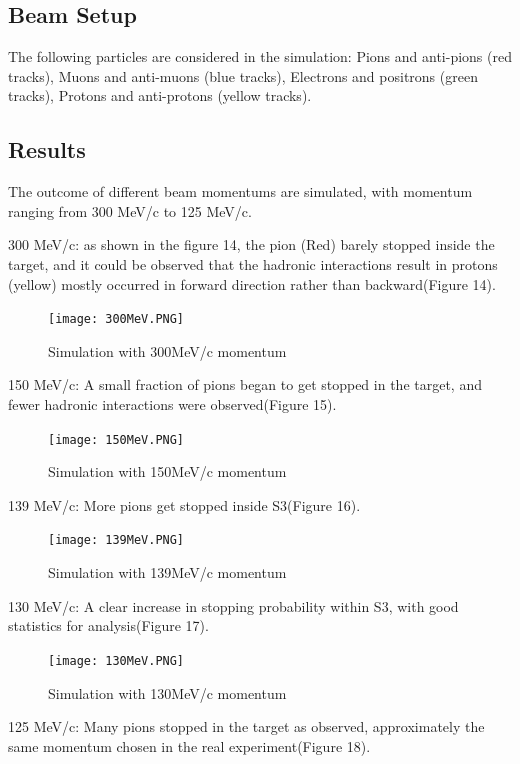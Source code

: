 \documentclass[11pt,a4paper]{article}
\begin{document}
\subsection{Beam Setup}
The following particles are considered in the simulation: Pions and anti-pions (red tracks), Muons and anti-muons (blue tracks), Electrons and positrons (green tracks), Protons and anti-protons (yellow tracks). 

\subsection{Results}
The outcome of different beam momentums are simulated, with momentum ranging from 300 MeV/c to 125 MeV/c. 

300 MeV/c: as shown in the figure 14, the pion (Red) barely stopped inside the target, and it could be observed that the hadronic interactions result in protons (yellow) mostly occurred in forward direction rather than backward(Figure 14).

\begin{figure}[h]
\centering
\texttt{[image: 300MeV.PNG]}
\caption{Simulation with 300MeV/c momentum}
\label{STOPscope}
\end{figure}

150 MeV/c: A small fraction of pions began to get stopped in the target, and fewer hadronic interactions were observed(Figure 15).

\begin{figure}[h]
\centering
\texttt{[image: 150MeV.PNG]}
\caption{Simulation with 150MeV/c momentum}
\label{STOPscope}
\end{figure}

139 MeV/c: More pions get stopped inside S3(Figure 16). 

\begin{figure}[h]
\centering
\texttt{[image: 139MeV.PNG]}
\caption{Simulation with 139MeV/c momentum}
\label{STOPscope}
\end{figure}

130 MeV/c: A clear increase in stopping probability within S3, with good statistics for analysis(Figure 17).

\begin{figure}[h]
\centering
\texttt{[image: 130MeV.PNG]}
\caption{Simulation with 130MeV/c momentum}
\label{STOPscope}
\end{figure}

125 MeV/c: Many pions stopped in the target as observed, approximately the same momentum chosen in the real experiment(Figure 18).
\end{document}
